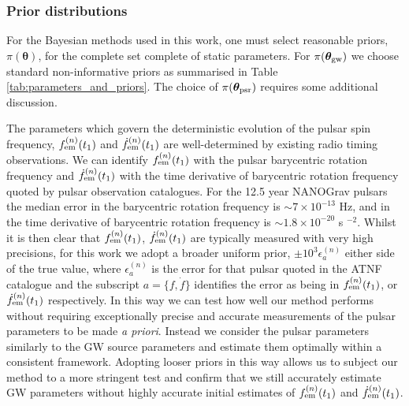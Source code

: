 \documentclass[fleqn,usenatbib,useAMS]{mnras}
\begin{document}
\subsubsection{Prior distributions}\label{sec:priors}
For the Bayesian methods used in this work, one must select reasonable priors, $\pi(\boldsymbol{\theta})$, for the complete set complete of static parameters. For $\pi(\boldsymbol{\theta}_{\rm gw})$ we choose standard non-informative priors \citep[e.g.][]{Bhagwat2021} as summarised in Table \ref{tab:parameters_and_priors}. The choice of $\pi(\boldsymbol{\theta}_{\rm psr})$ requires some additional discussion. \newline 


The parameters which govern the deterministic evolution of the pulsar spin frequency, $f_{\rm em}^{(n)} (t_1)$ and $\dot{f}_{\rm em}^{(n)} (t_1)$ are well-determined by existing radio timing observations. We can identify $f_{\rm em}^{(n)} (t_1)$ with the pulsar barycentric rotation frequency and $\dot{f}_{\rm em}^{(n)} (t_1)$ with the time derivative of barycentric rotation frequency quoted by pulsar observation catalogues. For the 12.5 year NANOGrav pulsars the median error in  the barycentric rotation frequency is $\sim 7 \times 10^{-13}$ Hz, and in the time derivative of barycentric rotation frequency is $\sim 1.8 \times 10^{-20}$ s $^{-2}$. Whilst it is then clear that $f_{\rm em}^{(n)} (t_1)$, $\dot{f}_{\rm em}^{(n)} (t_1)$ are typically measured with very high precisions, for this work we adopt a broader uniform prior, $\pm 10^3 \epsilon^{(n)}_{a}$ either side of the true value, where $\epsilon^{(n)}_{a}$ is the error for that pulsar quoted in the ATNF catalogue and the subscript $a = \{ f, \dot{f} \}$ identifies the error as being in $f_{\rm em}^{(n)} (t_1)$, or $\dot{f}_{\rm em}^{(n)} (t_1)$ respectively. In this way we can test how well our method performs without requiring exceptionally precise and accurate measurements of the pulsar parameters to be made \textit{a priori}. Instead we consider the pulsar parameters similarly to the GW source parameters and estimate them optimally within a consistent framework. Adopting looser priors in this way allows us to subject our method to a more stringent test and confirm that we still accurately estimate GW parameters without highly accurate initial estimates of $f_{\rm em}^{(n)} (t_1)$ and $\dot{f}_{\rm em}^{(n)} (t_1)$. \newline 
\end{document}
